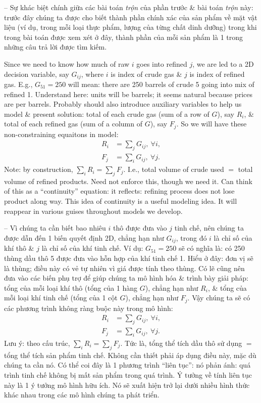 \documentclass{article}
\begin{document}
\begin{itemize}
\begin{itemize}
\begin{itemize}
            -- Sự khác biệt chính giữa các bài toán {\it trộn} của phần trước \& bài toán {\it trộn} này: trước đây chúng ta được cho biết thành phần chính xác của sản phẩm về mặt vật liệu (ví dụ, trong mỗi loại thực phẩm, lượng của từng chất dinh dưỡng) trong khi trong bài toán được xem xét ở đây, thành phần của mỗi sản phẩm là 1 trong những câu trả lời được tìm kiếm.

            Since we need to know how much of raw $i$ goes into refined $j$, we are led to a 2D decision variable, say $G_{ij}$, where $i$ is index of crude gas \& $j$ is index of refined gas. E.g., $G_{51} = 250$ will mean: there are 250 barrels of crude 5 going into mix of refined 1. Understand here: units will be barrels; it seems natural because prices are per barrels. Probably should also introduce auxiliary variables to help us model \& present solution: total of each crude gas (sum of a row of $G$), say $R_i$, \& total of each refined gas (sum of a column of $G$), say $F_j$. So we will have these non-constraining equaitons in model:
            \begin{align*}
                R_i &= \sum_j G_{ij},\ \forall i,\\
                F_j &= \sum_i G_{ij},\ \forall j.
            \end{align*}
            Note: by construction, $\sum_i R_i = \sum_j F_j$. I.e., total volume of crude used $=$ total volume of refined products. Need not enforce this, though we need it. Can think of this as a ``continuity'' equation: it reflects: refining process does not lose product along way. This idea of continuity is a useful modeling idea. It will reappear in various guises throughout models we develop.

            -- Vì chúng ta cần biết bao nhiêu $i$ thô được đưa vào $j$ tinh chế, nên chúng ta được dẫn đến 1 biến quyết định 2D, chẳng hạn như $G_{ij}$, trong đó $i$ là chỉ số của khí thô \& $j$ là chỉ số của khí tinh chế. Ví dụ: $G_{51} = 250$ sẽ có nghĩa là: có 250 thùng dầu thô 5 được đưa vào hỗn hợp của khí tinh chế 1. Hiểu ở đây: đơn vị sẽ là thùng; điều này có vẻ tự nhiên vì giá được tính theo thùng. Có lẽ cũng nên đưa vào các biến phụ trợ để giúp chúng ta mô hình hóa \& trình bày giải pháp: tổng của mỗi loại khí thô (tổng của 1 hàng $G$), chẳng hạn như $R_i$, \& tổng của mỗi loại khí tinh chế (tổng của 1 cột $G$), chẳng hạn như $F_j$. Vậy chúng ta sẽ có các phương trình không ràng buộc này trong mô hình:
            \begin{align*}
                R_i &= \sum_j G_{ij},\ \forall i,\\
                F_j &= \sum_i G_{ij},\ \forall j.
            \end{align*}
            Lưu ý: theo cấu trúc, $\sum_i R_i = \sum_j F_j$. Tức là, tổng thể tích dầu thô sử dụng $=$ tổng thể tích sản phẩm tinh chế. Không cần thiết phải áp dụng điều này, mặc dù chúng ta cần nó. Có thể coi đây là 1 phương trình ``liên tục'': nó phản ánh: quá trình tinh chế không bị mất sản phẩm trong quá trình. Ý tưởng về tính liên tục này là 1 ý tưởng mô hình hữu ích. Nó sẽ xuất hiện trở lại dưới nhiều hình thức khác nhau trong các mô hình chúng ta phát triển.


\end{itemize}
\end{itemize}
\end{itemize}
\end{document}
